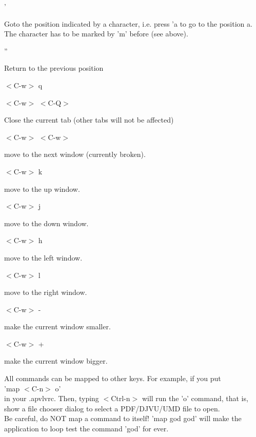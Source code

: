 \documentclass[a4paper,12pt]{article}
\begin{document}
\begin{description}
\item '

Goto the position indicated by a character, i.e. press 'a to go to the position a. \\
The character has to be marked by 'm' before (see above).

\item ''

Return to the previous position

\item $<$C-w$>$ q
\item $<$C-w$>$ $<$C-Q$>$

Close the current tab (other tabs will not be affected)

\item $<$C-w$>$ $<$C-w$>$

move to the next window (currently broken).

\item $<$C-w$>$ k

move to the up window.

\item $<$C-w$>$ j

move to the down window.

\item $<$C-w$>$ h

move to the left window.

\item $<$C-w$>$ l

move to the right window.

\item $<$C-w$>$ -

make the current window smaller.

\item $<$C-w$>$ +

make the current window bigger.

\end{description}

\noindent All commands can be mapped to other keys. For example, if you put \\
'map $<$C-n$>$ o'\\
in your .apvlvrc. Then, typing $<$Ctrl-n$>$ will run the 'o' command, that is, show a file chooser dialog to select a PDF/DJVU/UMD file to open.\\
\noindent Be careful, do NOT map a command to itself! 'map god god' will make the application to loop test the command 'god' for ever.
\end{document}
